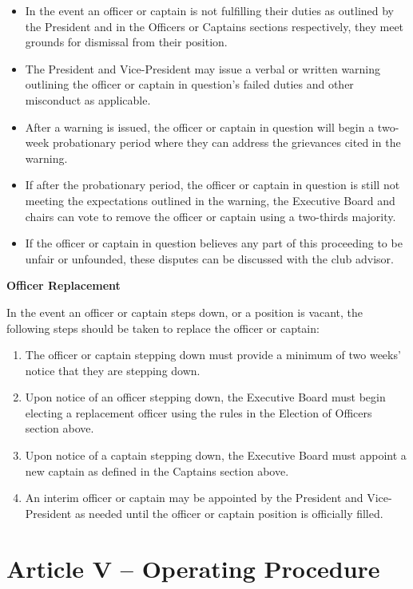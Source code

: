 \documentclass[12pt]{article}
\begin{document}
\begin{itemize}
  \item In the event an officer or captain is not fulfilling their duties as outlined by the President and in the Officers or Captains sections respectively, they meet grounds for dismissal from their position.
  \item The President and Vice-President may issue a verbal or written warning outlining the officer or captain in question's failed duties and other misconduct as applicable.
  \item After a warning is issued, the officer or captain in question will begin a two-week probationary period where they can address the grievances cited in the warning.
  \item If after the probationary period, the officer or captain in question is still not meeting the expectations outlined in the warning, the Executive Board and chairs can vote to remove the officer or captain using a two-thirds majority.
  \item If the officer or captain in question believes any part of this proceeding to be unfair or unfounded, these disputes can be discussed with the club advisor.
\end{itemize}

\textbf{Officer Replacement}

In the event an officer or captain steps down, or a position is vacant, the following steps should be taken to replace the officer or captain:
\begin{enumerate}
  \item The officer or captain stepping down must provide a minimum of two weeks' notice that they are stepping down.
  \item Upon notice of an officer stepping down, the Executive Board must begin electing a replacement officer using the rules in the Election of Officers section above.
  \item Upon notice of a captain stepping down, the Executive Board must appoint a new captain as defined in the Captains section above.
  \item An interim officer or captain may be appointed by the President and Vice-President as needed until the officer or captain position is officially filled.
\end{enumerate}

\section*{Article V -- Operating Procedure}
\end{document}
